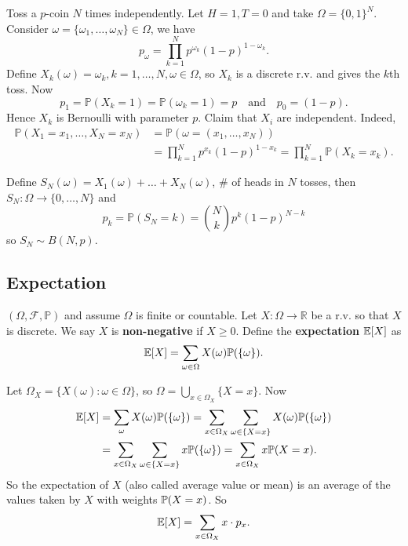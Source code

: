 \begin{example}
    Toss a $p$-coin $N$ times independently. Let $H=1,T=0$ and take $ \Omega=\{0,1\}^N $. Consider $ \omega = \{\omega_1,\dots,\omega_N\}\in \Omega $, we have 
    \[
        p_\omega = \prod_{k=1}^{N} p^{\omega_k} (1-p)^{1-\omega_k}.
    \]
    Define $ X_k(\omega)=\omega_k, k=1,\dots,N,\omega\in \Omega $, so $X_k$ is a discrete r.v. and gives the $k$th toss. Now 
    \[
        p_1 = \mathbb{P}(X_k=1) = \mathbb{P}(\omega_k=1)=p\quad \text{and}\quad p_0 = (1-p).
    \]
    Hence $X_k$ is Bernoulli with parameter $p$. Claim that $X_i$ are independent. Indeed, 
    \begin{align*}
        \mathbb{P}(X_1=x_1,\dots,X_N=x_N) &= \mathbb{P}(\omega = (x_1,\dots,x_N)) \\
        &= \prod_{k=1}^{N}p^{x_k} (1-p)^{1-x_k}=\prod_{k=1}^{N}\mathbb{P}(X_k=x_k).
    \end{align*}
\end{example}

Define $ S_N(\omega) = X_1(\omega)+\dots+X_N(\omega) $, \# of heads in $N$ tosses, then $ S_N:\Omega\to \{0,\dots,N\} $ and 
\[
    p_k=\mathbb{P}(S_N=k) = \binom{N}{k} p^k(1-p)^{N-k}
\]
so $S_N\sim B(N,p)$.

\subsection{Expectation}
\begin{definition}
    $ (\Omega,\mathscr{F},\mathbb{P}) $ and assume $\Omega$ is finite or countable. Let $ X:\Omega\to \mathbb{R}  $ be a r.v. so that $X$ is discrete. We say $X$ is \textbf{non-negative} if $ X\ge 0 $. Define the \textbf{expectation} $ {\mathbb{E}}[X] $ as 
    \[
        {\mathbb{E}}[X] = \sum_{\omega\in \Omega} X(\omega) \mathbb{P}(\{\omega\}).
    \]
\end{definition}

Let $ \Omega_X=\{X(\omega):\omega\in \Omega\} $, so $ \Omega = \bigcup_{x\in \Omega_X}\{X=x\} $. Now 
\begin{align*}
    {\mathbb{E}}[X]&=\sum_\omega X(\omega){\mathbb{P}}(\{\omega\}) = \sum_{x\in \Omega_X} \sum_{\omega\in \{X=x\}}X(\omega){\mathbb{P}}(\{\omega\})\\ 
    &=\sum_{x\in \Omega_X} \sum_{\omega\in \{X=x\}}x{\mathbb{P}}(\{\omega\})=\sum_{x\in \Omega_X}x {\mathbb{P}}(X=x).
\end{align*}
So the expectation of $X$ (also called average value or mean) is an average of the values taken by $X$ with weights ${\mathbb{P}}(X=x)$. So 
\[
    {\mathbb{E}}[X] = \sum_{x\in \Omega_X}x\cdot p_x.
\]


